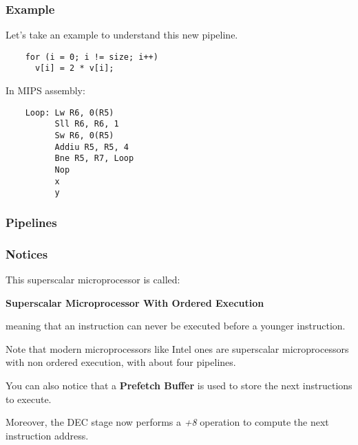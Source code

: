 
\begin{frame}[containsverbatim]
  \frametitle{Example}

  Let's take an example to understand this new pipeline.

  \begin{verbatim}
    for (i = 0; i != size; i++)
      v[i] = 2 * v[i];
  \end{verbatim}

  In MIPS assembly:

  \begin{verbatim}
    Loop: Lw R6, 0(R5)
          Sll R6, R6, 1
          Sw R6, 0(R5)
          Addiu R5, R5, 4
          Bne R5, R7, Loop
          Nop
          x
          y
  \end{verbatim}
\end{frame}


\begin{frame}
  \frametitle{Pipelines}

  \begin{center}
  \end{center}
\end{frame}


\begin{frame}
  \frametitle{Notices}

  This superscalar microprocessor is called:

  \-

  \textbf{Superscalar Microprocessor With Ordered Execution}

  \-

  meaning that an instruction can never be executed before a
  younger instruction.

  \-

  Note that modern microprocessors like Intel ones are superscalar
  microprocessors with non ordered execution, with about four pipelines.

  \-

  You can also notice that a \textbf{Prefetch Buffer} is used to store
  the next instructions to execute.

  \-

  Moreover, the DEC stage now performs a \textit{+8} operation to compute
  the next instruction address.
\end{frame}


